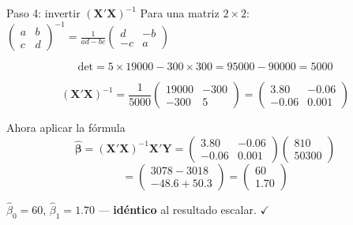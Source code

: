 \documentclass[aspectratio=169, 11pt]{beamer}
\begin{document}
\begin{frame}{Paso 4: invertir $(\mathbf{X}'\mathbf{X})^{-1}$}
\small
Para una matriz $2 \times 2$: $\begin{pmatrix} a & b \\ c & d \end{pmatrix}^{-1} = \frac{1}{ad - bc}\begin{pmatrix} d & -b \\ -c & a \end{pmatrix}$

\vspace{0.2cm}
\[
\text{det} = 5 \times 19000 - 300 \times 300 = 95000 - 90000 = 5000
\]

\[
(\mathbf{X}'\mathbf{X})^{-1} = \frac{1}{5000}\begin{pmatrix} 19000 & -300 \\ -300 & 5 \end{pmatrix} = \begin{pmatrix} 3.80 & -0.06 \\ -0.06 & 0.001 \end{pmatrix}
\]

\vspace{0.2cm}
\begin{alertblock}{Ahora aplicar la fórmula}
\[
\hat{\boldsymbol{\beta}} = (\mathbf{X}'\mathbf{X})^{-1}\mathbf{X}'\mathbf{Y} = \begin{pmatrix} 3.80 & -0.06 \\ -0.06 & 0.001 \end{pmatrix} \begin{pmatrix} 810 \\ 50300 \end{pmatrix}
\]
\[
= \begin{pmatrix} 3078 - 3018 \\ -48.6 + 50.3 \end{pmatrix} = \boxed{\begin{pmatrix} 60 \\ 1.70 \end{pmatrix}}
\]
\end{alertblock}

$\hat{\beta}_0 = 60$, $\hat{\beta}_1 = 1.70$ --- \textbf{idéntico} al resultado escalar. $\checkmark$
\end{frame}

\end{document}
